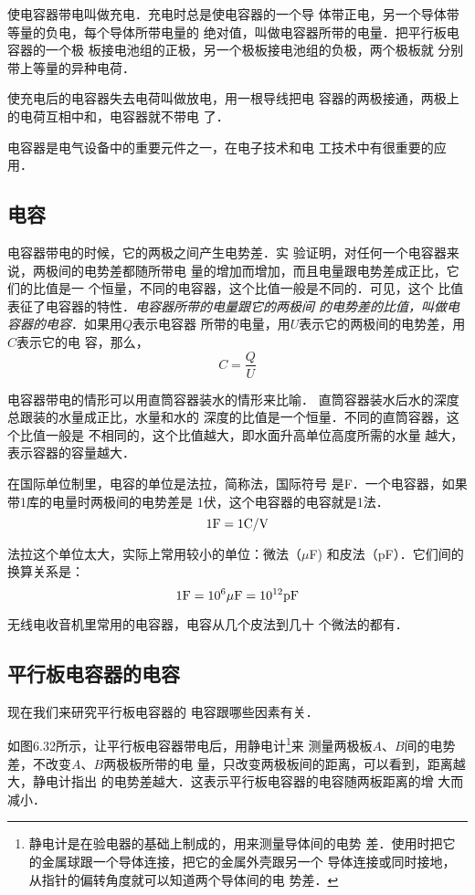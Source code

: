 使电容器带电叫做充电．充电时总是使电容器的一个导
体带正电，另一个导体带等量的负电，每个导体所带电量的
绝对值，叫做电容器所带的电量．把平行板电容器的一个极
板接电池组的正极，另一个极板接电池组的负极，两个极板就
分别带上等量的异种电荷．

使充电后的电容器失去电荷叫做放电，用一根导线把电
容器的两极接通，两极上的电荷互相中和，电容器就不带电
了．

电容器是电气设备中的重要元件之一，在电子技术和电
工技术中有很重要的应用．

\subsection{电容}
电容器带电的时候，它的两极之间产生电势差．实
验证明，对任何一个电容器来说，两极间的电势差都随所带电
量的增加而增加，而且电量跟电势差成正比，它们的比值是一
个恒量，不同的电容器，这个比值一般是不同的．可见，这个
比值表征了电容器的特性．\textit{电容器所带的电量跟它的两极间
的电势差的比值，叫做电容器的电容}．如果用$Q$表示电容器
所带的电量，用$U$表示它的两极间的电势差，用$C$表示它的电
容，那么，
\[C=\frac{Q}{U} \]

电容器带电的情形可以用直筒容器装水的情形来比喻．
直筒容器装水后水的深度总跟装的水量成正比，水量和水的
深度的比值是一个恒量．不同的直筒容器，这个比值一般是
不相同的，这个比值越大，即水面升高单位高度所需的水量
越大，表示容器的容量越大．

在国际单位制里，电容的单位是法拉，简称法，国际符号
是F．一个电容器，如果带1库的电量时两极间的电势差是
1伏，这个电容器的电容就是1法．
\[1{\rm F}=1{\rm C}/{\rm V}\]

法拉这个单位太大，实际上常用较小的单位：微法（$\mu$F)
和皮法（pF）．它们间的换算关系是：
\[1{\rm F}=10^6\mu{\rm F}=10^{12}{\rm pF}\]

无线电收音机里常用的电容器，电容从几个皮法到几十
个微法的都有．

\subsection{平行板电容器的电容}


现在我们来研究平行板电容器的
电容跟哪些因素有关．

如图6.32所示，让平行板电容器带电后，用静电计\footnote{静电计是在验电器的基础上制成的，用来测量导体间的电势
差．使用时把它的金属球跟一个导体连接，把它的金属外壳跟另一个
导体连接或同时接地，从指针的偏转角度就可以知道两个导体间的电
势差．}来
测量两极板$A$、$B$间的电势差，不改变$A$、$B$两极板所带的电
量，只改变两极板间的距离，可以看到，距离越大，静电计指出
的电势差越大．这表示平行板电容器的电容随两板距离的增
大而减小．

